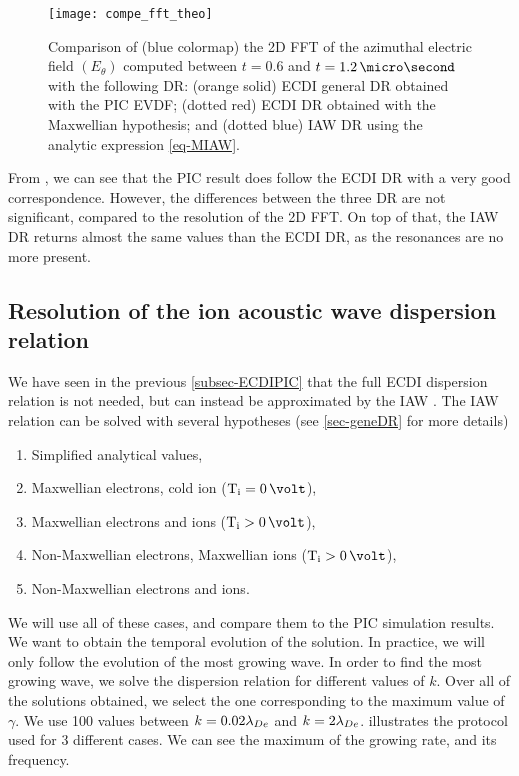     \begin{figure}[!hbt]
      \centering
      \texttt{[image: compe\_fft\_theo]}
      \caption{Comparison of (blue colormap) the \acs{2D} \acs{FFT} of the azimuthal electric field $(E_{\theta})$ computed between  $t=0.6$ and $t=1.2\,\micro\second$ with the following \acs{DR}\string: (orange solid) \acs{ECDI} general \acs{DR} obtained with the \acs{PIC} \acs{EVDF}; (dotted red) \acs{ECDI} \acs{DR} obtained with the Maxwellian hypothesis; and (dotted blue) \acs{IAW} \acs{DR} using the analytic expression \cref{eq-MIAW}.   }
      \label{fig-DR_and_fft}
    \end{figure}
    
    From , we can see that the \ac{PIC} result does follow the \ac{ECDI} \ac{DR} with a very good correspondence.
    However, the differences between the three \ac{DR} are not significant, compared to the resolution of the \ac{2D} \ac{FFT}.
    On top of that, the \ac{IAW} \ac{DR} returns almost the same values than the \ac{ECDI} \ac{DR}, as the resonances are no more present.
    
  \FloatBarrier
  \subsection{Resolution of the ion acoustic wave dispersion relation} \label{subsec-VDFIAW}
  
  We have seen in the previous \cref{subsec-ECDIPIC} that the full \ac{ECDI} dispersion relation is not needed, but can instead be approximated by the \ac{IAW} \citep{lafleur2018,janhunen2018,taccogna2019}.
  The \ac{IAW} relation can be solved with several hypotheses (see \cref{sec-geneDR} for more details)
  \begin{enumerate}
    \item Simplified analytical values,
    \item Maxwellian electrons, cold ion ($\Ti = 0\,\volt$),
    \item Maxwellian electrons and ions ($\Ti > 0\,\volt$),
    \item Non-Maxwellian electrons, Maxwellian ions ($\Ti > 0\,\volt$),
    \item Non-Maxwellian electrons and ions.
  \end{enumerate}
  
  We will use all of these cases, and compare them to the \ac{PIC} simulation results.
  We want to obtain the temporal evolution of the solution.
  In practice, we will only follow the evolution of the most growing wave.
  In order to find the most growing wave, we solve the dispersion relation for different values of $k$.
  Over all of the solutions obtained, we select the one corresponding to the maximum value of $\gamma$.
  We use 100 values between $k=0.02 \lambda_{De}$ and $k = 2 \lambda_{De}$.
   illustrates the protocol used for 3 different cases.
  We can see the maximum of the growing rate, and its frequency.
  

